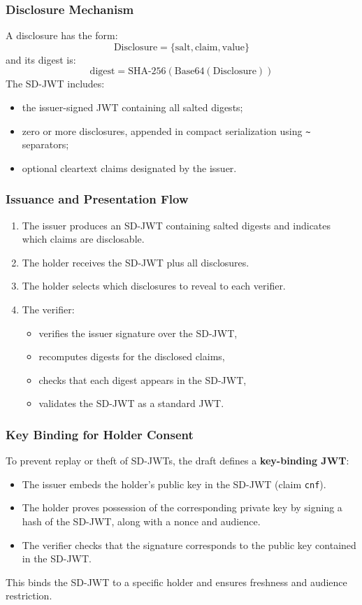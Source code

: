 \subsubsection*{Disclosure Mechanism}
A disclosure has the form:
\[
    \text{Disclosure} = \{\text{salt}, \text{claim}, \text{value}\}
\]
and its digest is:
\[
    \text{digest} = \text{SHA-256}(\text{Base64}( \text{Disclosure}))
\]
The SD-JWT includes:
\begin{itemize}
    \item the issuer-signed JWT containing all salted digests;
    \item zero or more disclosures, appended in compact serialization using \texttt{\textasciitilde} separators;
    \item optional cleartext claims designated by the issuer.
\end{itemize}

\subsubsection*{Issuance and Presentation Flow}
\begin{enumerate}
    \item The issuer produces an SD-JWT containing salted digests and indicates which claims are disclosable.
    \item The holder receives the SD-JWT plus all disclosures.
    \item The holder selects which disclosures to reveal to each verifier.
    \item The verifier:
    \begin{itemize}
        \item verifies the issuer signature over the SD-JWT,
        \item recomputes digests for the disclosed claims,
        \item checks that each digest appears in the SD-JWT,
        \item validates the SD-JWT as a standard JWT.
    \end{itemize}
\end{enumerate}

\subsubsection*{Key Binding for Holder Consent}
To prevent replay or theft of SD-JWTs, the draft defines a \textbf{key-binding JWT}:
\begin{itemize}
    \item The issuer embeds the holder’s public key in the SD-JWT (claim \texttt{cnf}).
    \item The holder proves possession of the corresponding private key by signing a hash of the SD-JWT, along with a nonce and audience.
    \item The verifier checks that the signature corresponds to the public key contained in the SD-JWT.
\end{itemize}
This binds the SD-JWT to a specific holder and ensures freshness and audience restriction.


